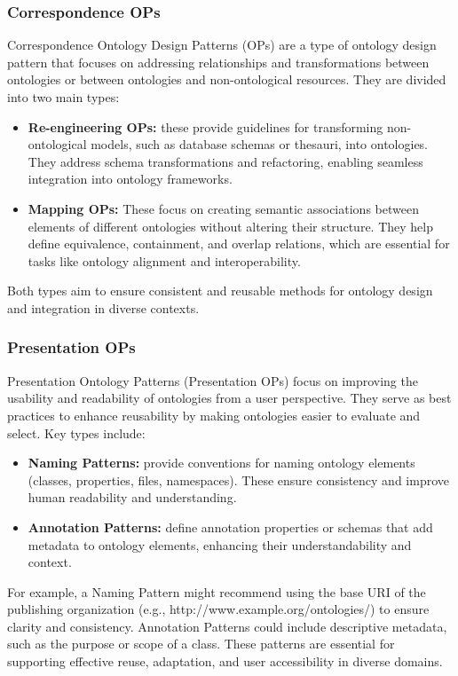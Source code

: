 \subsubsection{Correspondence OPs}
Correspondence Ontology Design Patterns (OPs) are a type of ontology design pattern that focuses on addressing relationships and transformations between ontologies or between ontologies and non-ontological resources. They are divided into two main types:
\begin{itemize}
    \item \textbf{Re-engineering OPs:} these provide guidelines for transforming non-ontological models, such as database schemas or thesauri, into ontologies. They address schema transformations and refactoring, enabling seamless integration into ontology frameworks.

    \item \textbf{Mapping OPs:} These focus on creating semantic associations between elements of different ontologies without altering their structure. They help define equivalence, containment, and overlap relations, which are essential for tasks like ontology alignment and interoperability.
\end{itemize}
Both types aim to ensure consistent and reusable methods for ontology design and integration in diverse contexts. 

\subsubsection{Presentation OPs}
Presentation Ontology Patterns (Presentation OPs) focus on improving the usability and readability of ontologies from a user perspective. They serve as best practices to enhance reusability by making ontologies easier to evaluate and select. Key types include:
\begin{itemize}
    \item \textbf{Naming Patterns:} provide conventions for naming ontology elements (classes, properties, files, namespaces). These ensure consistency and improve human readability and understanding.

    \item \textbf{Annotation Patterns:} define annotation properties or schemas that add metadata to ontology elements, enhancing their understandability and context.
\end{itemize}
For example, a Naming Pattern might recommend using the base URI of the publishing organization (e.g., http://www.example.org/ontologies/) to ensure clarity and consistency. Annotation Patterns could include descriptive metadata, such as the purpose or scope of a class. These patterns are essential for supporting effective reuse, adaptation, and user accessibility in diverse domains.

